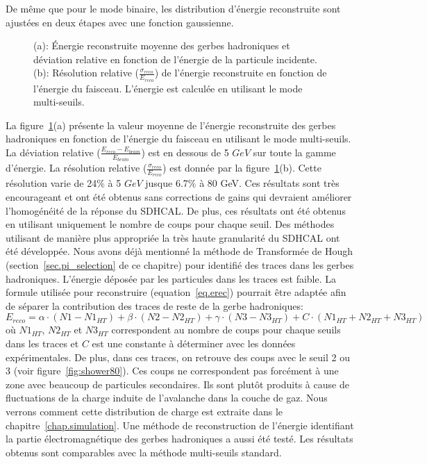 De même que pour le mode binaire, les distribution d'énergie reconstruite sont ajustées en deux étapes avec une fonction gaussienne. 
\begin{figure}[!h]
  \begin{center}
    \caption{(a): Énergie reconstruite moyenne des gerbes hadroniques et déviation relative en fonction de l'énergie de la particule incidente. (b): Résolution relative ($\frac{\sigma_{reco}}{E_{reco}}$) de l'énergie reconstruite en fonction de l'énergie du faisceau. L'énergie est calculée en utilisant le mode multi-seuils.}
    \label{fig:energy_sd}
  \end{center}
\end{figure}
La figure~\ref{fig:energy_sd}(a) présente la valeur moyenne de l'énergie reconstruite des gerbes hadroniques en fonction de l'énergie du faisceau en utilisant le mode multi-seuils. La déviation relative ($\frac{E_{reco}-E_{beam}}{E_{beam}}$) est en dessous de 5 $GeV$ sur toute la gamme d'énergie. La résolution relative ($\frac{\sigma_{reco}}{E_{reco}}$) est donnée par la figure~\ref{fig:energy_sd}(b). Cette résolution varie de 24$\%$ à 5 $GeV$ jusque 6.7$\%$ à 80 GeV. Ces résultats sont très encourageant et ont été obtenus sans corrections de gains qui devraient améliorer l'homogénéité de la réponse du SDHCAL. De plus, ces résultats ont été obtenus en utilisant uniquement le nombre de coups pour chaque seuil. Des méthodes utilisant de manière plus appropriée la très haute granularité du SDHCAL ont été développée. Nous avons déjà mentionné la méthode de Transformée de Hough (section~\ref{sec.pi_selection} de ce chapitre) pour identifié des traces dans les gerbes hadroniques. L'énergie déposée par les particules dans les traces est faible. La formule utilisée pour reconstruire (equation~\ref{eq.erec}) pourrait être adaptée afin de séparer la contribution des traces de reste de la gerbe hadroniques:
\begin{equation}
  E_{reco}=\alpha\cdot (N1-N1_{HT})+\beta\cdot (N2-N2_{HT})+\gamma\cdot (N3-N3_{HT}) + C\cdot(N1_{HT}+N2_{HT}+N3_{HT}) 
  \label{eq.erec_ht}
\end{equation}
où $N1_{HT}$, $N2_{HT}$ et $N3_{HT}$ correspondent au nombre de coups pour chaque seuils dans les traces et $C$ est une constante à déterminer avec les données expérimentales. De plus, dans ces traces, on retrouve des coups avec le seuil 2 ou 3 (voir figure~\ref{fig:shower80}). Ces coups ne correspondent pas forcément à une zone avec beaucoup de particules secondaires. Ils sont plutôt produits à cause de fluctuations de la charge induite de l'avalanche dans la couche de gaz. Nous verrons comment cette distribution de charge est extraite dans le chapitre~\ref{chap.simulation}. Une méthode de reconstruction de l'énergie identifiant la partie électromagnétique des gerbes hadroniques a aussi été testé. Les résultats obtenus sont comparables avec la méthode multi-seuils standard. 
